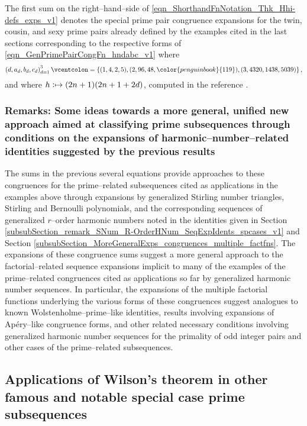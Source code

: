 \documentclass[12pt,reqno]{article}
\numberwithin{sfootnote}{section}
\numberwithin{equation}{section}
\theoremstyle{plain}
\theoremstyle{definition}
\theoremstyle{remark}
\newcommand{\defequals}{\ensuremath{\vcentcolon=}}
\newcommand{\defmapsto}{\ensuremath{\vcentcolon\mapsto}}
\begin{document}
The first sum on the right--hand--side of 
\eqref{eqn_ShorthandFnNotation_Thk_Hhi-defs_exps_v1} 
denotes the special prime pair congruence expansions for the 
twin, cousin, and sexy prime pairs already defined by the 
examples cited in the last sections corresponding to the 
respective forms of \eqref{eqn_GenPrimePairCongFn_hndabc_v1} where 
\[\left(d, a_d, b_d, c_d\right)_{d=1}^{3} \defequals \left\{
 (1, 4, 2, 5), (2, 96, 48, {\color{penguinbook}{119}}), 
 (3, 4320, 1438, 5039) \right\}, 
\] 
and where $h \defmapsto (2n+1)(2n+1+2d)$, 
computed in the reference \citep{SUMMARYNBREF-STUB}. 

\subsubsection{Remarks: Some ideas towards a 
               more general, unified new 
               approach aimed at classifying 
               prime subsequences through conditions on the expansions of 
               harmonic--number--related identities 
               suggested by the previous results} 
\label{subsubSection_remark_MmCompsWith_the_SigmaPkg}

The sums in the previous several equations provide approaches to these 
congruences for the prime--related subsequences cited as 
applications in the examples above through expansions by 
generalized Stirling number triangles, Stirling and 
Bernoulli polynomials, and the 
corresponding sequences of generalized $r$--order harmonic numbers 
noted in the identities given in 
Section \ref{subsubSection_remark_SNum_R-OrderHNum_SeqExpIdents_spcases_v1} and 
Section \ref{subsubSection_MoreGeneralExps_congruences_multiple_factfns}. 
The expansions of these congruence sums suggest a 
more general approach to the factorial--related sequence expansions 
implicit to many of the examples of the prime--related congruences 
cited as applications so far by generalized harmonic number sequences. 
In particular, 
the expansions of the multiple factorial functions 
underlying the various forms of these congruences 
suggest analogues to known Wolstenholme--prime--like identities, 
results involving expansions of Ap\'{e}ry--like congruence forms, and 
other related necessary conditions involving 
generalized harmonic number sequences for the 
primality of odd integer pairs and other cases of the 
prime--related subsequences. 

\subsection{Applications of Wilson's theorem in 
            other famous and notable special case prime subsequences} 
\label{subsubSection-Examples_SomeResults_for_Prime_k-Tuples} 
\end{document}

